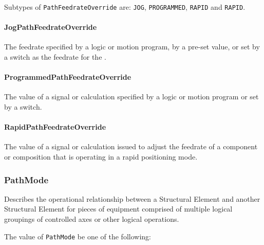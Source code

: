 Subtypes of \texttt{PathFeedrateOverride} are: \texttt{JOG}, \texttt{PROGRAMMED}, \texttt{RAPID} and \texttt{RAPID}. 
\FloatBarrier

\paragraph{JogPathFeedrateOverride}\mbox{}
\label{sec:JogPathFeedrateOverride}



The feedrate specified by a logic or motion program, by a pre-set value, or set by a switch as the feedrate for the . 


\paragraph{ProgrammedPathFeedrateOverride}\mbox{}
\label{sec:ProgrammedPathFeedrateOverride}



The value of a signal or calculation specified by a logic or motion program or set by a switch.


\paragraph{RapidPathFeedrateOverride}\mbox{}
\label{sec:RapidPathFeedrateOverride}



The value of a signal or calculation issued to adjust the feedrate of a component or composition that is operating in a rapid positioning mode.


\subsubsection{PathMode}
\label{sec:PathMode}



Describes the operational relationship between a  \gls{Structural Element} and another  \gls{Structural Element} for pieces of equipment comprised of multiple logical groupings of controlled axes or other logical operations.


The value of \texttt{PathMode} \MUST be one of the following: 


